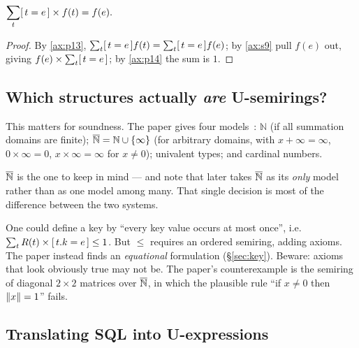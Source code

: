 \begin{lemma}\label{lem:15}
$\displaystyle \sum_{t}[\,t=e\,]\times f(t) = f(e).$
\end{lemma}
\begin{proof}
By \eqref{ax:p13}, $\sum_{t}[\,t=e\,]f(t) = \sum_{t}[\,t=e\,]f(e)$; by \eqref{ax:s9} pull
$f(e)$ out, giving $f(e)\times\sum_{t}[\,t=e\,]$; by \eqref{ax:p14} the sum is $1$.
\end{proof}


\subsection{Which structures actually \emph{are} U-semirings?}

This matters for soundness. The paper gives four models~\cite[\S3.1]{udp}:
$\mathbb{N}$ (if all summation domains are finite);
$\overline{\mathbb{N}} = \mathbb{N}\cup\{\infty\}$ (for arbitrary domains, with $x+\infty=\infty$,
$0\times\infty=0$, $x\times\infty=\infty$ for $x\neq0$);
univalent types; and cardinal numbers.

$\overline{\mathbb{N}}$ is the one to keep in mind --- and note that \QED{} later takes $\overline{\mathbb{N}}$ as its
\emph{only} model rather than as one model among many. That single decision is most of the
difference between the two systems.

\begin{remark}
One could define a key by ``every key value occurs at most once'', i.e.\
$\sum_{t}R(t)\times[\,t.k=e\,] \le 1$. But $\le$ requires an ordered semiring, adding
axioms. The paper instead finds an \emph{equational} formulation (\S\ref{sec:key}).
Beware: axioms that look obviously true may not be. The paper's counterexample is the
semiring of diagonal $2\times2$ matrices over $\overline{\mathbb{N}}$, in which the plausible rule
``if $x\neq0$ then $\left\lVert x \right\rVert=1$'' fails.
\end{remark}

\subsection{Translating SQL into U-expressions}

